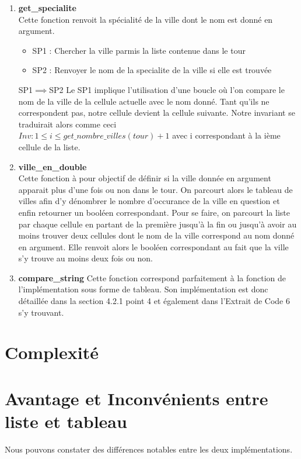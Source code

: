 \documentclass[a4paper, 11pt, oneside]{article}
\begin{document}
\begin{enumerate}
    \item \textbf{get\_specialite}
    \\Cette fonction renvoit la spécialité de la ville dont le nom est donné en argument.
    \begin{itemize}
        \item SP1 : Chercher la ville parmis la liste contenue dans le tour
        \item SP2 : Renvoyer le nom de la specialite de la ville si elle est trouvée
    \end{itemize}
    SP1$\implies$SP2
    Le SP1 implique l'utilisation d'une boucle où l'on compare le nom de la ville de la cellule 
    actuelle avec le nom donné. Tant qu'ils ne correspondent pas, notre cellule devient la cellule 
    suivante. Notre invariant se traduirait alors comme ceci
    \\$Inv : 1\leq i \leq get\_nombre\_villes(tour)+1$ avec i correspondant à la ième cellule de la liste.
    \item \textbf{ville\_en\_double}
    \\Cette fonction à pour objectif de définir si la ville donnée en argument apparait plus d’une
    fois ou non dans le tour. On parcourt alors le tableau de villes afin d’y dénombrer le nombre
    d’occurance de la ville en question et enfin retourner un booléen correspondant.
    Pour se faire, on parcourt la liste par chaque cellule en partant de la première jusqu'à la fin ou jusqu'à
    avoir au moins trouver deux cellules dont le nom de la ville correspond au nom donné en argument.
    Elle renvoit alors le booléen correspondant au fait que la ville s'y trouve au moins deux fois ou non.
    \item \textbf{compare\_string}
    Cette fonction correspond parfaitement à la fonction de l'implémentation sous forme de tableau. Son 
    implémentation est donc détaillée dans la section 4.2.1 point 4 et également dans l'Extrait 
    de Code 6 s'y trouvant.
\end{enumerate}

\section{\textbf{Complexité}}

\section{\textbf{Avantage et Inconvénients entre liste et tableau}}
Nous pouvons constater des différences notables entre les deux implémentations.
\end{document}
